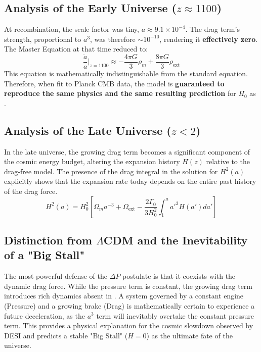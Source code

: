 \documentclass{BSpacePaper} %
\begin{document}
\begin{appendices}
\subsection{Analysis of the Early Universe ($z \approx 1100$)}
At recombination, the scale factor was tiny, $a \approx 9.1 \times 10^{-4}$. The drag term's strength, proportional to $a^3$, was therefore $\sim 10^{-10}$, rendering it \textbf{effectively zero}. The \bspace{} Master Equation at that time reduced to:
\begin{equation}
    \frac{\ddot{a}}{a} \bigg|_{z=1100} \approx -\frac{4\pi G}{3}\rho_m + \frac{8\pi G}{3}\rho_{\text{ext}}
\end{equation}
This equation is mathematically indistinguishable from the standard \lcdm{} equation. Therefore, when fit to Planck CMB data, the \bspace{} model is \textbf{guaranteed to reproduce the same physics and the same resulting prediction} for $H_0$ as \lcdm{}.

\subsection{Analysis of the Late Universe ($z < 2$)}
In the late universe, the growing drag term becomes a significant component of the cosmic energy budget, altering the expansion history $H(z)$ relative to the drag-free \lcdm{} model. The presence of the drag integral in the solution for $H^2(a)$ explicitly shows that the expansion rate today depends on the entire past history of the drag force.
\begin{equation}
    H^2(a) = H_0^2 \left[ \Omega_m a^{-3} + \Omega_{\text{ext}} - \frac{2\Gamma_0}{3H_0^2} \int_1^a a'^3 H(a') da' \right]
\end{equation}

\subsection{Distinction from \(\Lambda\)CDM and the Inevitability of a "Big Stall"}
The most powerful defense of the $\Delta P$ postulate is that it coexists with the dynamic drag force. While the pressure term is constant, the growing drag term introduces rich dynamics absent in \lcdm{}. A system governed by a constant engine (Pressure) and a growing brake (Drag) is mathematically certain to experience a future deceleration, as the $a^3$ term will inevitably overtake the constant pressure term. This provides a physical explanation for the cosmic slowdown observed by DESI and predicts a stable "Big Stall" ($H=0$) as the ultimate fate of the universe.


\end{appendices}
\end{document}
